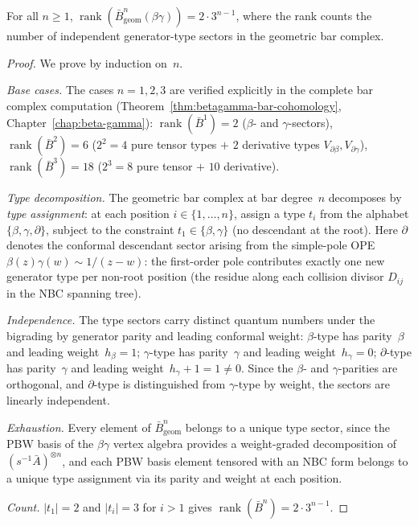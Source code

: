 \begin{theorem}\label{thm:betagamma-bar-dim}
For all $n \geq 1$, $\operatorname{rank}(\bar{B}^n_{\mathrm{geom}}(\beta\gamma)) = 2 \cdot 3^{n-1}$,
where the rank counts the number of independent generator-type sectors in the
geometric bar complex.
\end{theorem}

\begin{proof}
We prove by induction on~$n$.

\emph{Base cases.}  The cases $n = 1, 2, 3$ are verified explicitly in the
complete bar complex computation (Theorem~\ref{thm:betagamma-bar-cohomology},
Chapter~\ref{chap:beta-gamma}):
$\operatorname{rank}(\bar{B}^1) = 2$ ($\beta$- and $\gamma$-sectors),
$\operatorname{rank}(\bar{B}^2) = 6$ ($2^2 = 4$ pure tensor types $+$ $2$
derivative types $V_{\partial\beta}, V_{\partial\gamma}$),
$\operatorname{rank}(\bar{B}^3) = 18$ ($2^3 = 8$ pure tensor $+$ $10$ derivative).

\emph{Type decomposition.}  The geometric bar complex at bar degree~$n$
decomposes by \emph{type assignment}: at each position
$i \in \{1, \ldots, n\}$, assign a type $t_i$ from the alphabet
$\{\beta, \gamma, \partial\}$, subject to the constraint $t_1 \in \{\beta, \gamma\}$
(no descendant at the root).  Here $\partial$ denotes the conformal
descendant sector arising from the simple-pole OPE
$\beta(z)\gamma(w) \sim 1/(z{-}w)$: the first-order pole contributes
exactly one new generator type per non-root position (the residue
along each collision divisor $D_{ij}$ in the NBC spanning tree).

\emph{Independence.}  The type sectors carry distinct quantum numbers
under the bigrading by generator parity and leading conformal weight:
$\beta$-type has parity~$\beta$ and leading weight~$h_\beta = 1$;
$\gamma$-type has parity~$\gamma$ and leading weight~$h_\gamma = 0$;
$\partial$-type has parity~$\gamma$ and leading weight~$h_\gamma + 1 = 1 \neq 0$.
Since the $\beta$- and $\gamma$-parities are orthogonal, and $\partial$-type
is distinguished from $\gamma$-type by weight, the sectors are linearly
independent.

\emph{Exhaustion.}  Every element of $\bar{B}^n_{\mathrm{geom}}$ belongs
to a unique type sector, since the PBW basis of the $\beta\gamma$ vertex
algebra provides a weight-graded decomposition of $(s^{-1}\bar{A})^{\otimes n}$,
and each PBW basis element tensored with an NBC form belongs to a
unique type assignment via its parity and weight at each position.

\emph{Count.}  $|t_1| = 2$ and $|t_i| = 3$ for $i > 1$ gives
$\operatorname{rank}(\bar{B}^n) = 2 \cdot 3^{n-1}$.
\end{proof}

